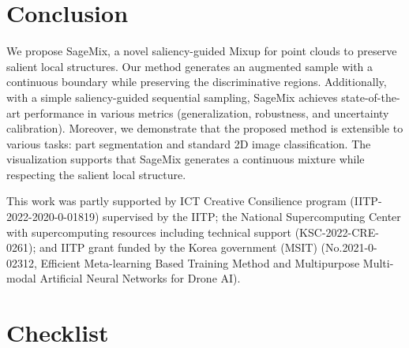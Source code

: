 \documentclass{article}
\begin{document}
 \section{Conclusion}
\label{sec:con}
We propose SageMix, a novel saliency-guided Mixup for point clouds to preserve salient local structures. Our method generates an augmented sample with a continuous boundary while preserving the discriminative regions.
Additionally, with a simple saliency-guided sequential sampling, SageMix achieves state-of-the-art performance in various metrics (\eg generalization, robustness, and uncertainty calibration). Moreover, we demonstrate that the proposed method is extensible to various tasks: part segmentation and standard 2D image classification.
The visualization supports that SageMix generates a continuous mixture while respecting the salient local structure.


\begin{ack}
This work was partly supported by ICT Creative Consilience program (IITP-2022-2020-0-01819) supervised by the IITP; the National Supercomputing Center with supercomputing resources including technical support (KSC-2022-CRE-0261); and IITP grant funded by the Korea government (MSIT) (No.2021-0-02312, Efficient Meta-learning Based Training Method and Multipurpose Multi-modal Artificial Neural Networks for Drone AI).
\end{ack}
 
 


\newpage


\section*{Checklist}
\end{document}
